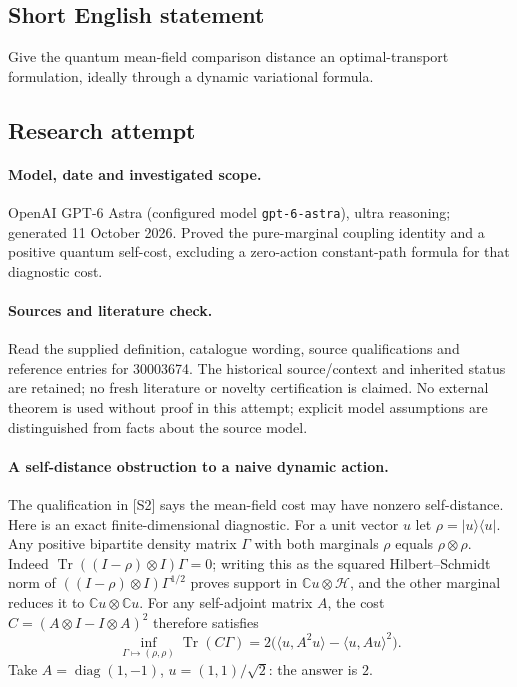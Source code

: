 \documentclass[11pt]{article}
\begin{document}
\subsection{Short English statement}
Give the quantum mean-field comparison distance an optimal-transport formulation, ideally through a dynamic variational formula.
\subsection{Research attempt}
\paragraph{Model, date and investigated scope.}
OpenAI GPT-6 Astra (configured model \texttt{gpt-6-astra}), ultra reasoning; generated 11 October 2026. Proved the pure-marginal coupling identity and a positive quantum self-cost, excluding a zero-action constant-path formula for that diagnostic cost.

\paragraph{Sources and literature check.}
Read the supplied definition, catalogue wording, source qualifications and reference entries for 30003674. The historical source/context and inherited status are retained; no fresh literature or novelty certification is claimed. No external theorem is used without proof in this attempt; explicit model assumptions are distinguished from facts about the source model.

\paragraph{A self-distance obstruction to a naive dynamic action.} The qualification in [S2] says the mean-field cost may have nonzero self-distance. Here is an exact finite-dimensional diagnostic. For a unit vector \(u\) let \(\rho=|u\rangle\langle u|\). Any positive bipartite density matrix \(\Gamma\) with both marginals \(\rho\) equals \(\rho\otimes\rho\). Indeed \(\operatorname{Tr}((I-\rho)\otimes I)\Gamma=0\); writing this as the squared Hilbert--Schmidt norm of \(((I-\rho)\otimes I)\Gamma^{1/2}\) proves support in \(\mathbb Cu\otimes\mathcal H\), and the other marginal reduces it to \(\mathbb Cu\otimes\mathbb Cu\).
For any self-adjoint matrix \(A\), the cost \(C=(A\otimes I-I\otimes A)^2\) therefore satisfies
\[
 \inf_{\Gamma\mapsto(\rho,\rho)}\operatorname{Tr}(C\Gamma)
 =2\big(\langle u,A^2u\rangle-\langle u,Au\rangle^2\big).
\]
Take \(A=\operatorname{diag}(1,-1)\), \(u=(1,1)/\sqrt2\): the answer is \(2\).
\end{document}

